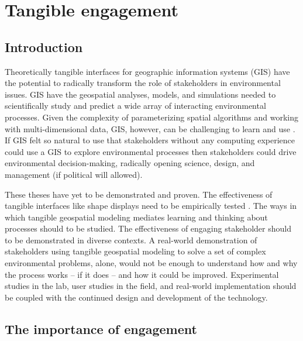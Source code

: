 \documentclass{article}
\begin{document}

\section{Tangible engagement}

\subsection{Introduction}

Theoretically tangible interfaces for geographic information systems (GIS) have the potential to
radically transform the role of stakeholders in 
environmental issues. 
%
GIS have the geospatial analyses, models, and simulations 
needed to scientifically study and predict a wide array of interacting environmental processes. 
%
Given the complexity of parameterizing spatial algorithms and working with multi-dimensional data, 
GIS, however, can be challenging to learn and use \citep{Ratti2004}.
%
If GIS felt so natural to use that stakeholders without any computing experience could use a GIS to explore environmental processes 
then stakeholders could drive environmental decision-making,
radically opening science, design, and management (if political will allowed). 
%

These theses have yet to be demonstrated and proven. 
The effectiveness of tangible interfaces like shape displays need to be empirically tested \citep{Rasmussen2012}. 
The ways in which tangible geospatial modeling mediates learning and thinking about processes should to be studied. 
The effectiveness of engaging stakeholder should to be demonstrated in diverse contexts. 
A real-world demonstration of stakeholders using tangible geospatial modeling to solve a set of complex environmental problems, 
alone,
would not be enough to understand how and why the process works -- if it does -- and how it could be improved. 
Experimental studies in the lab, user studies in the field, and real-world implementation should be coupled with the continued design and development of the technology.


\subsection{The importance of engagement}
\end{document}
